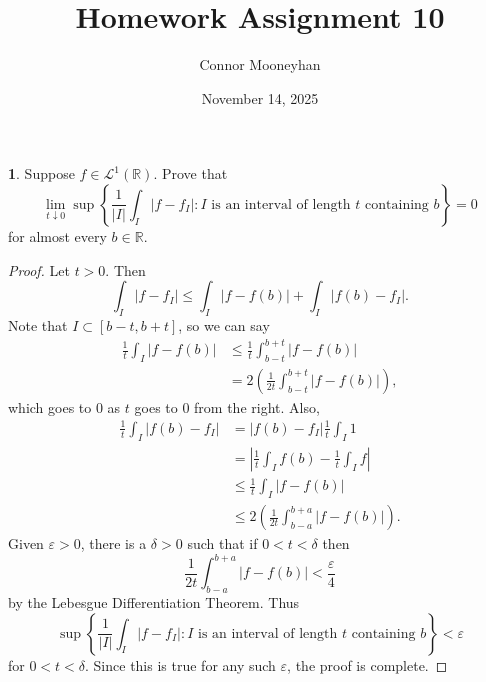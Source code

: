 \documentclass[12pt]{article}
\title{Homework Assignment 10}
\author{Connor Mooneyhan}
\date{November 14, 2025}
\theoremstyle{definition}
\newtheorem{ex}{}
\newenvironment{exercise}[1]{
	\renewcommand{\theex}{#1}
	\begin{ex}
		}{\end{ex}}
\begin{document}
\maketitle

\begin{exercise}{4B.2}
	Suppose $f \in \mathcal{L}^1(\mathbb{R})$.
	Prove that \begin{equation*}
		\lim_{t \downarrow 0} \sup \left\lbrace \frac{1}{|I|} \int_I |f - f_I| : I \text{ is an interval of length $t$ containing $b$} \right\rbrace = 0
	\end{equation*}
	for almost every $b \in \mathbb{R}$.
\end{exercise}
\begin{proof}
	Let $t > 0$. Then \begin{equation}
		\int_I |f - f_I| \leq \int_I |f-f(b)| + \int_I |f(b) - f_I|.\label{4B.2.1}
	\end{equation}
	Note that $I \subset [b-t, b+t]$, so we can say \begin{align*}
		\frac{1}{t} \int_I |f - f(b)| & \leq \frac{1}{t}\int_{b-t}^{b+t}|f-f(b)|                  \\
		                              & = 2 \left( \frac{1}{2t} \int_{b-t}^{b+t}|f-f(b)| \right),
	\end{align*}
	which goes to 0 as $t$ goes to 0 from the right.
	Also, \begin{align*}
		\frac{1}{t}\int_I |f(b) - f_I| & = |f(b) - f_I| \frac{1}{t} \int_I 1                           \\
		                               & = \left|\frac{1}{t} \int_I f(b) - \frac{1}{t} \int_I f\right| \\
		                               & \leq \frac{1}{t} \int_I |f - f(b)|                            \\
		                               & \leq 2 \left( \frac{1}{2t} \int_{b-a}^{b+a} |f-f(b)| \right).
	\end{align*}
	Given $\varepsilon > 0$, there is a $\delta > 0$ such that if $0 < t < \delta$ then \begin{equation*}
		\frac{1}{2t}\int_{b-a}^{b+a} |f-f(b)| < \frac{\varepsilon}{4}
	\end{equation*}
	by the Lebesgue Differentiation Theorem.
	Thus \begin{equation*}
		\sup \left\lbrace \frac{1}{|I|} \int_I |f - f_I| : I \text{ is an interval of length $t$ containing $b$} \right\rbrace < \varepsilon
	\end{equation*}
	for $0 < t < \delta$.
	Since this is true for any such $\varepsilon$, the proof is complete.
\end{proof}
\end{document}
